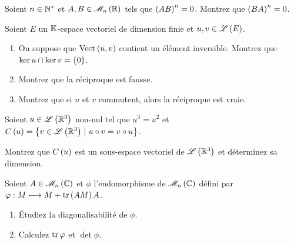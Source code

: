 \begin{corr}
\end{corr}

\begin{exo}
Soient \(n\in\mathbb{N}^*\) et \(A,B\in\M{n}[\R]\) tels que \(\left(AB\right)^n=0\). Montrez que \(\left(BA\right)^n=0\).
\end{exo}

\begin{corr}
\end{corr}

\begin{exo}
Soient \(E\) un \(\mathbb{K}\)-espace vectoriel de dimension finie et \(u,v\in\mathscr{L}\left(E\right)\).

\begin{enumerate}
    \item On suppose que \(\Vect{u,v}\) contient un élément inversible. Montrez que \(\ker u\cap\ker v=\left\lbrace0\right\rbrace\). \\
    \item Montrez que la réciproque est fausse. \\
    \item Montrez que si \(u\) et \(v\) commutent, alors la réciproque est vraie.
\end{enumerate}
\end{exo}

\begin{corr}
\end{corr}

\begin{exo}
Soient \(u\in\mathscr{L}\left(\mathbb{R}^3\right)\) non-nul tel que \(u^3=u^2\) et \(C\left(u\right)=\left\lbrace v\in\mathscr{L}\left(\mathbb{R}^3\right)\;\middle|\; u\circ v=v\circ u\right\rbrace\).

Montrez que \(C\left(u\right)\) est un sous-espace vectoriel de \(\mathscr{L}\left(\mathbb{R}^3\right)\) et déterminez sa dimension.
\end{exo}

\begin{corr}
\end{corr}

\begin{exo}
Soient \(A\in\M{n}[\C]\) et \(\phi\) l'endomorphisme de \(\M{n}[\C]\) défini par \(\varphi:M\longmapsto M+\operatorname{tr}\left(AM\right)A\).

\begin{enumerate}
    \item Étudiez la diagonalisabilité de \(\phi\). \\
    \item Calculez \(\operatorname{tr}\varphi\) et \(\det\phi\).
\end{enumerate}
\end{exo}

